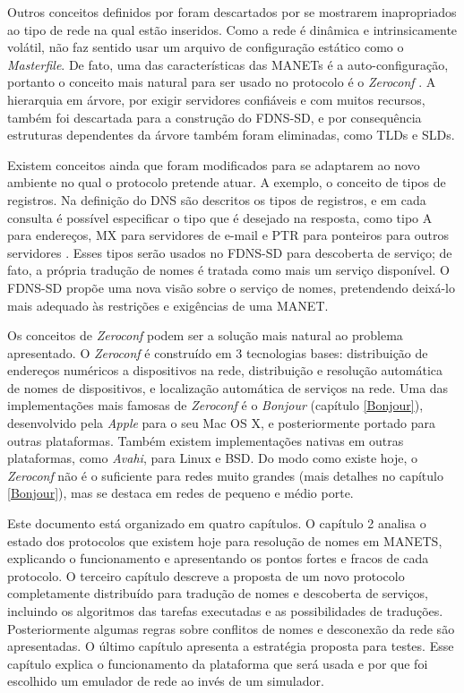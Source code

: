 Outros conceitos definidos por \cite{rfc1035} foram descartados por se mostrarem
inapropriados ao tipo de rede na qual estão inseridos. Como a rede é dinâmica e
intrinsicamente volátil, não faz sentido usar um arquivo de configuração estático
como o \textit{Masterfile}. De fato, uma das características das MANETs é a
auto-configuração, portanto o conceito mais natural para ser usado no protocolo
é o \textit{Zeroconf} \cite{zeroconf}. A hierarquia em árvore, por exigir servidores
confiáveis e com muitos recursos, também foi descartada para a construção do
FDNS-SD, e por consequência estruturas dependentes da árvore também foram eliminadas,
como TLDs e SLDs.

Existem conceitos ainda que foram modificados para se adaptarem ao novo ambiente
no qual o protocolo pretende atuar. A exemplo, o conceito de tipos de registros.
Na definição do DNS são descritos os tipos de registros, e em cada consulta é
possível especificar o tipo que é desejado na resposta, como tipo A para endereços,
MX para servidores de e-mail e PTR para ponteiros para outros servidores \cite{rfc1035}.
Esses tipos serão usados no FDNS-SD para descoberta de serviço; de
fato, a própria tradução de nomes é tratada como mais um serviço disponível. O
FDNS-SD propõe uma nova visão sobre o serviço de nomes, pretendendo deixá-lo mais
adequado às restrições e exigências de uma MANET.

Os conceitos de \textit{Zeroconf} podem ser a solução mais natural ao problema
apresentado. O \textit{Zeroconf} é construído em 3 tecnologias bases: distribuição
de endereços numéricos a dispositivos na rede, distribuição e resolução automática
de nomes de dispositivos, e localização automática de serviços na rede. Uma das
implementações mais famosas de \textit{Zeroconf} é o \textit{Bonjour} (capítulo \ref{Bonjour}),
desenvolvido pela \textit{Apple} para o seu Mac OS X, e posteriormente portado
para outras plataformas. Também existem implementações nativas em outras
plataformas, como \textit{Avahi}, para Linux e BSD. Do modo como existe hoje, o
\textit{Zeroconf} não é o suficiente para redes muito grandes (mais detalhes no
capítulo \ref{Bonjour}), mas se destaca em redes de pequeno e médio porte.


Este documento está organizado em quatro capítulos. O capítulo 2 analisa o estado
dos protocolos que existem hoje para resolução de nomes em MANETS, explicando o
funcionamento e apresentando os pontos fortes e fracos de cada protocolo.
O terceiro capítulo descreve a proposta de um novo protocolo completamente
distribuído para tradução de nomes e descoberta de serviços, incluindo os
algoritmos das tarefas executadas e as possibilidades de traduções. Posteriormente
algumas regras sobre conflitos de nomes e desconexão da rede são apresentadas.
O último capítulo apresenta a estratégia proposta para testes. Esse capítulo
explica o funcionamento da plataforma que será usada e por que foi escolhido um
emulador de rede ao invés de um simulador.